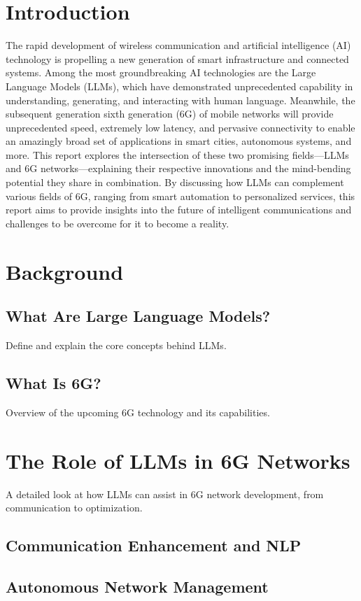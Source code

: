 \documentclass[12pt]{article}
\begin{document}
\section{Introduction}
The rapid development of wireless communication and artificial intelligence (AI) technology is propelling a new generation of smart infrastructure and connected systems. Among the most groundbreaking AI technologies are the Large Language Models (LLMs), which have demonstrated unprecedented capability in understanding, generating, and interacting with human language. Meanwhile, the subsequent generation sixth generation (6G) of mobile networks will provide unprecedented speed, extremely low latency, and pervasive connectivity to enable an amazingly broad set of applications in smart cities, autonomous systems, and more. This report explores the intersection of these two promising fields—LLMs and 6G networks—explaining their respective innovations and the mind-bending potential they share in combination. By discussing how LLMs can complement various fields of 6G, ranging from smart automation to personalized services, this report aims to provide insights into the future of intelligent communications and challenges to be overcome for it to become a reality.
\newpage
\section{Background}
	\subsection{What Are Large Language Models?}
	Define and explain the core concepts behind LLMs.

	\subsection{What Is 6G?}
	Overview of the upcoming 6G technology and its capabilities.
\newpage
\section{The Role of LLMs in 6G Networks}
A detailed look at how LLMs can assist in 6G network development, from communication to optimization.
	\subsection{Communication Enhancement and NLP}
	\subsection{Autonomous Network Management}
\end{document}
